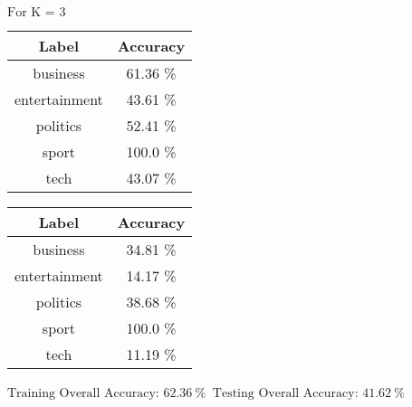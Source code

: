 \documentclass[8pt]{extarticle}
\begin{document}
    $\displaystyle \text{For K = }3$
    \begin{center}
        \quad
    \end{center}
    \begin{center}
        \begin{tabular}{cc}
            \hline
            Label & Accuracy\\
            \hline
            business &   61.36 \% \\
       entertainment &   43.61 \% \\
           politics  &   52.41 \% \\
              sport  &   100.0 \% \\
               tech  &   43.07 \%
         \end{tabular}
         \quad
        \begin{tabular}{cc}
            \hline
            Label & Accuracy\\
            \hline
            business &   34.81 \% \\
        entertainment &  14.17 \% \\
           politics  &   38.68 \% \\
              sport  &   100.0  \% \\
               tech  &   11.19 \%
        \end{tabular}
    \end{center}
    \begin{center}
        $\displaystyle \text{Training Overall Accuracy:\ }62.36\ \%$
        $\displaystyle \ \text{Testing Overall Accuracy:\ }41.62\ \%$
    \end{center}
\end{document}
